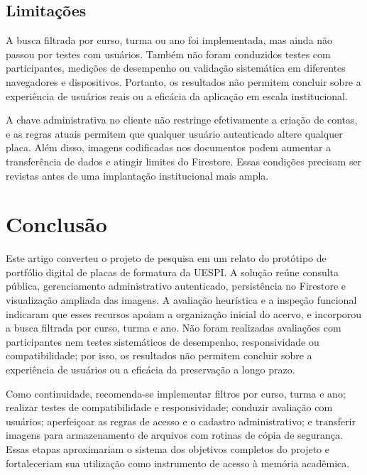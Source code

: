 \documentclass[12pt]{article}
\begin{document}
\subsection{Limitações}

A busca filtrada por curso, turma ou ano foi implementada, mas ainda não passou
por testes com usuários. Também não foram conduzidos testes com participantes,
medições de desempenho ou validação sistemática em diferentes navegadores e
dispositivos. Portanto, os resultados não permitem concluir sobre a experiência
de usuários reais ou a eficácia da aplicação em escala institucional.

A chave administrativa no cliente não restringe efetivamente a criação de
contas, e as regras atuais permitem que qualquer usuário autenticado altere
qualquer placa. Além disso, imagens codificadas nos documentos podem aumentar a
transferência de dados e atingir limites do Firestore. Essas condições precisam
ser revistas antes de uma implantação institucional mais ampla.

\section{Conclusão}

Este artigo converteu o projeto de pesquisa em um relato do protótipo de
portfólio digital de placas de formatura da UESPI. A solução reúne consulta
pública, gerenciamento administrativo autenticado, persistência no Firestore e
visualização ampliada das imagens. A avaliação heurística e a inspeção
funcional indicaram que esses recursos apoiam a organização inicial do acervo,
e incorporou a busca filtrada por curso, turma e ano. Não foram realizadas
avaliações com participantes nem testes
sistemáticos de desempenho, responsividade ou compatibilidade; por isso, os
resultados não permitem concluir sobre a experiência de usuários ou a eficácia
da preservação a longo prazo.

Como continuidade, recomenda-se implementar filtros por curso, turma e ano;
realizar testes de compatibilidade e responsividade; conduzir avaliação com
usuários; aperfeiçoar as regras de acesso e o cadastro administrativo; e
transferir imagens para armazenamento de arquivos com rotinas de cópia de
segurança. Essas etapas aproximariam o sistema dos objetivos completos do
projeto e fortaleceriam sua utilização como instrumento de acesso à memória
acadêmica.



\end{document}
